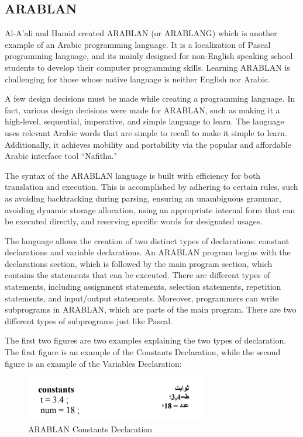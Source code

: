 \subsection{ARABLAN}
Al-A’ali and Hamid \cite{al1996design} created ARABLAN (or ARABLANG) which is another example of an Arabic programming language. It is a localization of Pascal programming language, and its mainly designed for non-English speaking school students to develop their computer programming skills. Learning ARABLAN is challenging for those whose native language is neither English nor Arabic. 

A few design decisions must be made while creating a programming language. In fact, various design decisions were made for ARABLAN, such as making it a high-level, sequential, imperative, and simple language to learn. The language uses relevant Arabic words that are simple to recall to make it simple to learn. Additionally, it achieves mobility and portability via the popular and affordable Arabic interface tool ``Nafitha." 

The syntax of the ARABLAN language is built with efficiency for both translation and execution. This is accomplished by adhering to certain rules, such as avoiding backtracking during parsing, ensuring an unambiguous grammar, avoiding dynamic storage allocation, using an appropriate internal form that can be executed directly, and reserving specific words for designated usages. 

The language allows the creation of two distinct types of declarations: constant declarations and variable declarations. An ARABLAN program begins with the declarations section, which is followed by the main program section, which contains the statements that can be executed. There are different types of statements, including assignment statements, selection statements, repetition statements, and input/output statements. Moreover, programmers can write subprograms in ARABLAN, which are parts of the main program. There are two different types of subprograms just like Pascal. 

The first two figures are two examples explaining the two types of declaration. The first figure is an example of the Constants Declaration, while the second figure is an example of the Variables Declaration:

\begin{figure}[h]
\centering
\includegraphics[width=8cm]{ch2-images/ARABLAN.png}
\caption{ARABLAN Constants Declaration \cite{al2007evaluation}}
\label{fig:ARABLAN Constants Declaration}
\end{figure}

